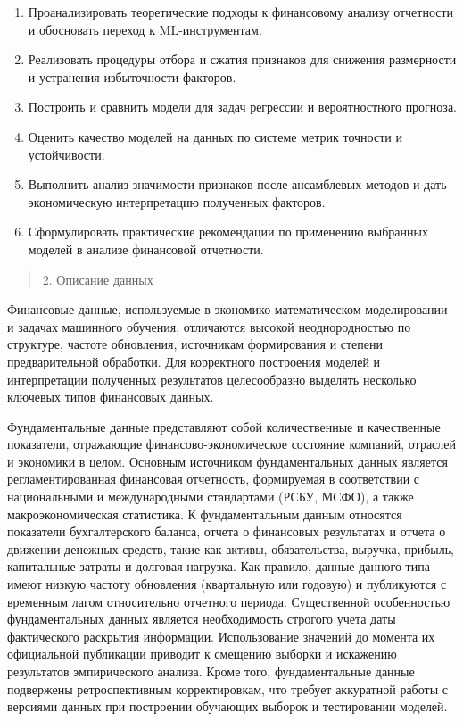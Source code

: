 \documentclass[
]{article}
\begin{document}
\begin{enumerate}
\def\labelenumi{\arabic{enumi}.}
\item
  Проанализировать теоретические подходы к финансовому анализу отчетности и обосновать переход к ML-инструментам.
\item
  Реализовать процедуры отбора и сжатия признаков для снижения размерности и устранения избыточности факторов.
\item
  Построить и сравнить модели для задач регрессии и вероятностного прогноза.
\item
  Оценить качество моделей на данных по системе метрик точности и устойчивости.
\item
  Выполнить анализ значимости признаков после ансамблевых методов и дать экономическую интерпретацию полученных факторов.
\item
  Сформулировать практические рекомендации по применению выбранных моделей в анализе финансовой отчетности.
\end{enumerate}

\begin{quote}
2. Описание данных
\end{quote}

Финансовые данные, используемые в экономико-математическом моделировании и задачах машинного обучения, отличаются высокой неоднородностью по структуре, частоте обновления, источникам формирования и степени предварительной обработки. Для корректного построения моделей и интерпретации полученных результатов целесообразно выделять несколько ключевых типов финансовых данных.

Фундаментальные данные представляют собой количественные и качественные показатели, отражающие финансово-экономическое состояние компаний, отраслей и экономики в целом. Основным источником фундаментальных данных является регламентированная финансовая отчетность, формируемая в соответствии с национальными и международными стандартами (РСБУ, МСФО), а также макроэкономическая статистика. К фундаментальным данным относятся показатели бухгалтерского баланса, отчета о финансовых результатах и отчета о движении денежных средств, такие как активы, обязательства, выручка, прибыль, капитальные затраты и долговая нагрузка. Как правило, данные данного типа имеют низкую частоту обновления (квартальную или годовую) и публикуются с временным лагом относительно отчетного периода. Существенной особенностью фундаментальных данных является необходимость строгого учета даты фактического раскрытия информации. Использование значений до момента их официальной публикации приводит к смещению выборки и искажению результатов эмпирического анализа. Кроме того, фундаментальные данные подвержены ретроспективным корректировкам, что требует аккуратной работы с версиями данных при построении обучающих выборок и тестировании моделей.
\end{document}
